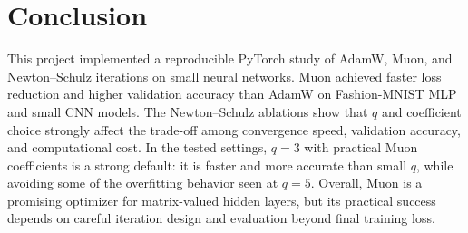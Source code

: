 \documentclass{article}
\begin{document}
\section{Conclusion}

This project implemented a reproducible PyTorch study of AdamW, Muon, and Newton--Schulz iterations on small neural networks. Muon achieved faster loss reduction and higher validation accuracy than AdamW on Fashion-MNIST MLP and small CNN models. The Newton--Schulz ablations show that $q$ and coefficient choice strongly affect the trade-off among convergence speed, validation accuracy, and computational cost. In the tested settings, $q=3$ with practical Muon coefficients is a strong default: it is faster and more accurate than small $q$, while avoiding some of the overfitting behavior seen at $q=5$. Overall, Muon is a promising optimizer for matrix-valued hidden layers, but its practical success depends on careful iteration design and evaluation beyond final training loss.



\end{document}
